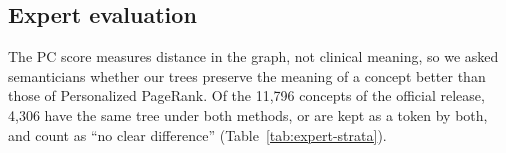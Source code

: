 \subsection{Expert evaluation}
\label{sec:results:expert}

The PC score measures distance in the graph, not clinical meaning, so we asked semanticians whether our trees preserve the meaning of a concept better than those of Personalized PageRank.
Of the 11,796 concepts of the official release, 4,306 have the same tree under both methods, or are kept as a token by both, and count as ``no clear difference'' (Table~\ref{tab:expert-strata}).
